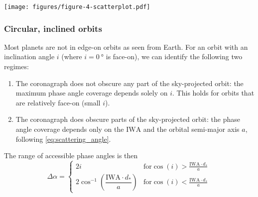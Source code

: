 \documentclass[usenatbib]{mnras}
\newcommand{\IWA}{\ensuremath{\mathrm{IWA}}\xspace}
\newcommand{\HWO}{HabWorlds\xspace}
\begin{document}
\begin{figure*}
    \centering
    \texttt{[image: figures/figure-4-scatterplot.pdf]}
    \caption{
        Scatter plot for the \HWO target stars, showing stellar effective temperatures and distances.
        The colours show $\Delta \alpha$ for hypothetical planets on circular, edge-on orbits at a semi-major axis $a$ corresponding to an Earth-like instellation and an IWA of \qty{61.9}{\mas}.
        The colour bar indicates the optical phenomena that can in principle be detected: all the phenomena from the bottom of the bar up to the colour of a given circle would be detectable for that planet.
        For example, dark blue circles indicate planets for which most phenomena would be accessible: planets that can be observed at the rainbow angle can also be observed at angles exhibiting {\bf the polarization peak due to Rayleigh scattering}.
    }
    \label{fig:scatterplot}
\end{figure*}

\subsubsection{Circular, inclined orbits}

Most planets are not in edge-on orbits as seen from Earth.
For an orbit with an inclination angle $i$ (where $i=\qty{0}{\degree}$ is face-on), we can identify the following two regimes:
\begin{enumerate}
    \item The coronagraph does not obscure any part of the sky-projected orbit: 
    the maximum phase angle coverage depends solely on $i$. 
        This holds for orbits that are relatively face-on (small $i$). 
    \item The coronagraph does obscure parts of the sky-projected orbit: the phase angle coverage depends only on the \IWA and the orbital semi-major axis $a$, following \cref{eq:scattering_angle}. 
\end{enumerate}

The range of accessible phase angles is then 
\begin{equation}
\label{eq:Delta_phi_max}
    \Delta \alpha = 
    \begin{cases}
        2 i & \textrm{for} \cos(i) > \frac{\mathrm{IWA} \cdot d_* }{a} \\ 
        2 \cos^{-1}\left(\dfrac{\mathrm{IWA} \cdot d_* }{a}\right) & \textrm{for} \cos(i) < \frac{\mathrm{IWA} \cdot d_* }{a}
    \end{cases} \,
\end{equation}
\end{document}
